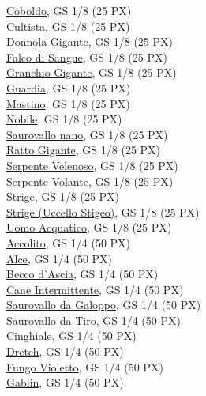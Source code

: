 \begin{multicols}{3}
{\hyperlink{Coboldo}{Coboldo}, GS 1/8 (25 PX)\\
\hyperlink{Cultista}{Cultista}, GS 1/8 (25 PX)\\
\hyperlink{Donnola Gigante}{Donnola Gigante}, GS 1/8 (25 PX)\\
\hyperlink{Falco di Sangue}{Falco di Sangue}, GS 1/8 (25 PX)\\
\hyperlink{Granchio Gigante}{Granchio Gigante}, GS 1/8 (25 PX)\\
\hyperlink{Guardia}{Guardia}, GS 1/8 (25 PX)\\
\hyperlink{Mastino}{Mastino}, GS 1/8 (25 PX)\\
\hyperlink{Nobile}{Nobile}, GS 1/8 (25 PX)\\
\hyperlink{Saurovallo nano}{Saurovallo nano}, GS 1/8 (25 PX)\\
\hyperlink{Ratto Gigante}{Ratto Gigante}, GS 1/8 (25 PX)\\
\hyperlink{Serpente Velenoso}{Serpente Velenoso}, GS 1/8 (25 PX)\\
\hyperlink{Serpente Volante}{Serpente Volante}, GS 1/8 (25 PX)\\
\hyperlink{Strige}{Strige}, GS 1/8 (25 PX)\\
\hyperlink{Strige (Uccello Stigeo)}{Strige (Uccello Stigeo)}, GS 1/8 (25 PX)\\
\hyperlink{Uomo Acquatico}{Uomo Acquatico}, GS 1/8 (25 PX)\\
\hyperlink{Accolito}{Accolito}, GS 1/4 (50 PX)\\
\hyperlink{Alce}{Alce}, GS 1/4 (50 PX)\\
\hyperlink{Becco d'Ascia}{Becco d'Ascia}, GS 1/4 (50 PX)\\
\hyperlink{Cane Intermittente}{Cane Intermittente}, GS 1/4 (50 PX)\\
\hyperlink{Saurovallo da Galoppo}{Saurovallo da Galoppo}, GS 1/4 (50 PX)\\
\hyperlink{Saurovallo da Tiro}{Saurovallo da Tiro}, GS 1/4 (50 PX)\\
\hyperlink{Cinghiale}{Cinghiale}, GS 1/4 (50 PX)\\
\hyperlink{Dretch}{Dretch}, GS 1/4 (50 PX)\\
\hyperlink{Fungo Violetto}{Fungo Violetto}, GS 1/4 (50 PX)\\
\hyperlink{Gablin}{Gablin}, GS 1/4 (50 PX)\\
}
\end{multicols}
